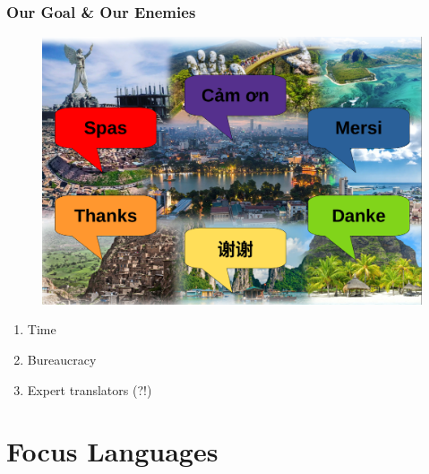 \documentclass[aspectratio=169]{beamer}
\begin{document}
\begin{frame}[fragile]
	\frametitle{Our Goal \& Our Enemies}
	\begin{minipage}{.49\textwidth}
    \begin{figure}
	    \centering
	    \includegraphics[width=1.0\textwidth]{images/title-banner.png}
	\end{figure}
	\end{minipage}
	\begin{minipage}{.49\textwidth}
	\begin{enumerate}
		\item Time
		\item Bureaucracy
		\item Expert translators (?!)
	\end{enumerate}
	\end{minipage}
\end{frame}


\section{Focus Languages}
\end{document}
